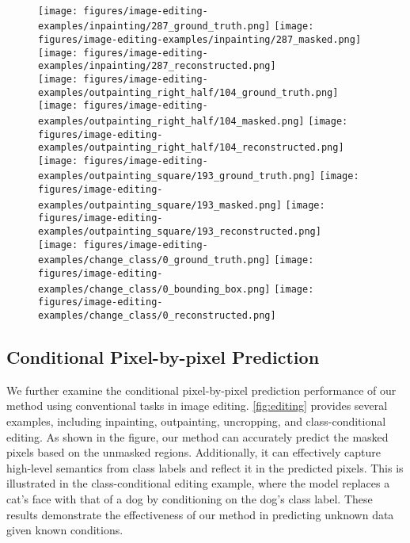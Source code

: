 \documentclass{article}
\newcommand{\hhs}{\hspace{-0.001em}}
\newcommand{\vvs}{\vspace{-.1em}}
\begin{document}
\begin{figure}[t]
    \hhs
    \hhs
    \vvs
    \\
    \texttt{[image: figures/image-editing-examples/inpainting/287\_ground\_truth.png]}\hhs
    \texttt{[image: figures/image-editing-examples/inpainting/287\_masked.png]}\hhs
    \texttt{[image: figures/image-editing-examples/inpainting/287\_reconstructed.png]}\vvs
    \\
    \texttt{[image: figures/image-editing-examples/outpainting\_right\_half/104\_ground\_truth.png]}\hhs
    \texttt{[image: figures/image-editing-examples/outpainting\_right\_half/104\_masked.png]}\hhs
    \texttt{[image: figures/image-editing-examples/outpainting\_right\_half/104\_reconstructed.png]}\vvs
    \\
    \texttt{[image: figures/image-editing-examples/outpainting\_square/193\_ground\_truth.png]}\hhs
    \texttt{[image: figures/image-editing-examples/outpainting\_square/193\_masked.png]}\hhs
    \texttt{[image: figures/image-editing-examples/outpainting\_square/193\_reconstructed.png]}\vvs
    \\
    \texttt{[image: figures/image-editing-examples/change\_class/0\_ground\_truth.png]}\hhs
    \texttt{[image: figures/image-editing-examples/change\_class/0\_bounding\_box.png]}\hhs
    \texttt{[image: figures/image-editing-examples/change\_class/0\_reconstructed.png]}\vvs
    \\
\vspace{-10pt}
    \vspace{-10pt}
    \label{fig:editing}
\end{figure}

\subsection{Conditional Pixel-by-pixel Prediction}

We further examine the conditional pixel-by-pixel prediction performance of our method using conventional tasks in image editing. \autoref{fig:editing} provides several examples, including inpainting, outpainting, uncropping, and class-conditional editing. As shown in the figure, our method can accurately predict the masked pixels based on the unmasked regions. Additionally, it can effectively capture high-level semantics from class labels and reflect it in the predicted pixels. This is illustrated in the class-conditional editing example, where the model replaces a cat's face with that of a dog by conditioning on the dog's class label. These results demonstrate the effectiveness of our method in predicting unknown data given known conditions.
\end{document}
